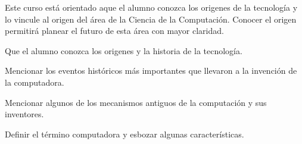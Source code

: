 \begin{syllabus}


\begin{justification}
Este curso está orientado aque el alumno conozca los origenes de la tecnología y lo vincule al origen del área de la Ciencia de la Computación. Conocer el origen permitirá planear el futuro de esta área con mayor claridad.
\end{justification}

\begin{goals}
\item Que el alumno conozca los origenes y la historia de la tecnología.
\item Mencionar los eventos históricos más importantes que llevaron a la invención de la computadora.
\item Mencionar algunos de los mecanismos antiguos de la computación y sus inventores.
\item Definir el término computadora y esbozar algunas características.
\end{goals}


\end{syllabus}
